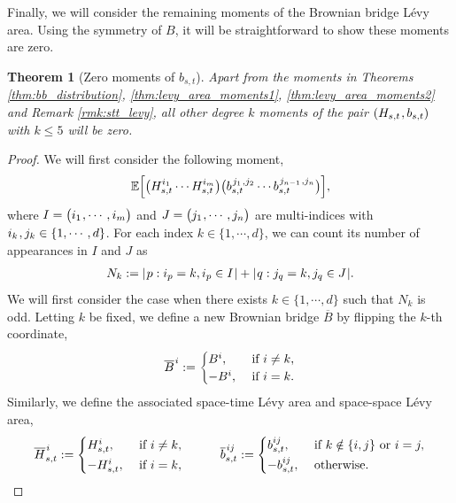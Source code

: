 \documentclass[sn-mathphys-num]{sn-jnl}%
\newtheorem{theorem}{Theorem}%
\newcommand{\E}{\mathbb{E}}
\newcommand{\m}{\hspace{0.25mm}}
\begin{document}
Finally, we will consider the remaining moments of the Brownian bridge L\'{e}vy area. Using the symmetry of $B$, it will be straightforward to show these moments are zero. \medbreak

\begin{theorem}[Zero moments of $b_{s,t}$]\label{thm:levy_area_moments3}
Apart from the moments in Theorems \ref{thm:bb_distribution}, \ref{thm:levy_area_moments1}, \ref{thm:levy_area_moments2} and Remark \ref{rmk:stt_levy}\m, all other degree $k$ moments of the pair $(H_{s,t}\m, b_{s,t})$ with $k\leq 5$ will be zero.
\end{theorem}
\begin{proof}
We will first consider the following moment,
\begin{align}\label{eq:target_moment}
\E\Big[\big(H_{s,t}^{i_1}\cdots H_{s,t}^{i_m}\big)\big(b_{s,t}^{\m j_1\m, j_2}\cdots b_{s,t}^{\m j_{n-1}\m, j_n}\big)\Big],
\end{align}
where $I = \big(i_1\m,\cdots, i_m\big)$ and $J = \big(j_1\m,\cdots, j_n\big)$ are multi-indices with $i_k\m, j_k\in\{1,\cdots,d\}$. For each index $k\in\{1,\cdots,d\}$, we can count its number of appearances in $I$ and $J$ as
\begin{align*}
N_k := |\m p : i_p = k, i_p\in I\m| + |\m q : j_q = k, j_q\in J\m|.
\end{align*}
We will first consider the case when there exists $k\in\{1,\cdots, d\}$ such that $N_k$ is odd.
Letting $k$ be fixed, we define a new Brownian bridge $\overline{B}$ by flipping the $k$-th coordinate,
\begin{align*}
\overline{B}^{\m i} := \begin{cases} B^i, & \text{ if }i\neq k,\\ -B^i, & \text{ if }i = k.\end{cases}
\end{align*}
Similarly, we define the associated space-time L\'{e}vy area and space-space L\'{e}vy area,
\begin{align*}
\overline{H}_{s,t}^{\m i} :=  \begin{cases} H_{s,t}^i, & \text{ if }i\neq k,\\[2pt] -H_{s,t}^i, & \text{ if }i = k,\end{cases}\hspace{10mm}\overline{b}_{s,t}^{\m ij} :=  \begin{cases} b_{s,t}^{ij}, & \text{ if }k\notin\{i,j\}\text{ or }i = j,\\[2pt] -b_{s,t}^{ij}, & \text{ otherwise}.\end{cases}

\end{align*}
\end{proof}
\end{document}
